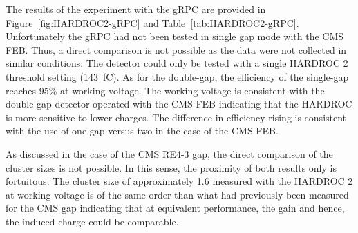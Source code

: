 	The results of the experiment with the gRPC are provided in Figure~\ref{fig:HARDROC2-gRPC} and Table~\ref{tab:HARDROC2-gRPC}. Unfortunately the gRPC had not been tested in single gap mode with the CMS FEB. Thus, a direct comparison is not possible as the data were not collected in similar conditions. The detector could only be tested with a single HARDROC 2 threshold setting (\SI{143}{fC}). As for the double-gap, the efficiency of the single-gap reaches 95\% at working voltage. The working voltage is consistent with the double-gap detector operated with the CMS FEB indicating that the HARDROC is more sensitive to lower charges. The difference in efficiency rising is consistent with the use of one gap versus two in the case of the CMS FEB.
	
	As discussed in the case of the CMS RE4-3 gap, the direct comparison of the cluster sizes is not possible. In this sense, the proximity of both results only is fortuitous. The cluster size of approximately 1.6 measured with the HARDROC 2 at working voltage is of the same order than what had previously been measured for the CMS gap indicating that at equivalent performance, the gain and hence, the induced charge could be comparable.
	
